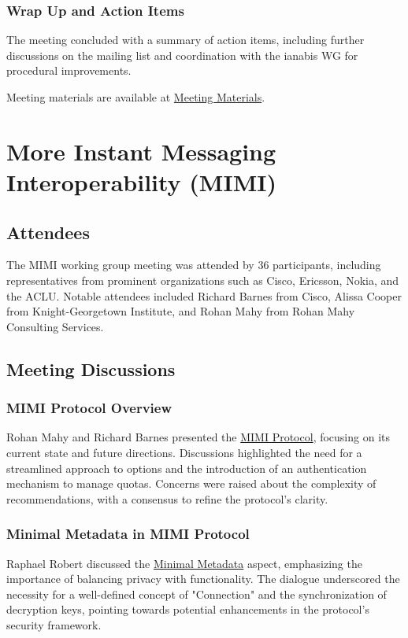 \documentclass{article}
\begin{document}
\subsubsection{Wrap Up and Action Items}
The meeting concluded with a summary of action items, including further discussions on the mailing list and coordination with the ianabis WG for procedural improvements.

Meeting materials are available at \href{https://example.com/meeting-materials}{Meeting Materials}.



\newpage

\section{More Instant Messaging Interoperability (MIMI)}

\subsection{Attendees}
The MIMI working group meeting was attended by 36 participants, including representatives from prominent organizations such as Cisco, Ericsson, Nokia, and the ACLU. Notable attendees included Richard Barnes from Cisco, Alissa Cooper from Knight-Georgetown Institute, and Rohan Mahy from Rohan Mahy Consulting Services.

\subsection{Meeting Discussions}

\subsubsection{MIMI Protocol Overview}
Rohan Mahy and Richard Barnes presented the \href{https://www.ietf.org/archive/id/draft-ietf-mimi-protocol-02.html}{MIMI Protocol}, focusing on its current state and future directions. Discussions highlighted the need for a streamlined approach to options and the introduction of an authentication mechanism to manage quotas. Concerns were raised about the complexity of recommendations, with a consensus to refine the protocol's clarity.

\subsubsection{Minimal Metadata in MIMI Protocol}
Raphael Robert discussed the \href{https://www.ietf.org/archive/id/draft-ietf-mimi-protocol-02.html}{Minimal Metadata} aspect, emphasizing the importance of balancing privacy with functionality. The dialogue underscored the necessity for a well-defined concept of "Connection" and the synchronization of decryption keys, pointing towards potential enhancements in the protocol's security framework.
\end{document}

